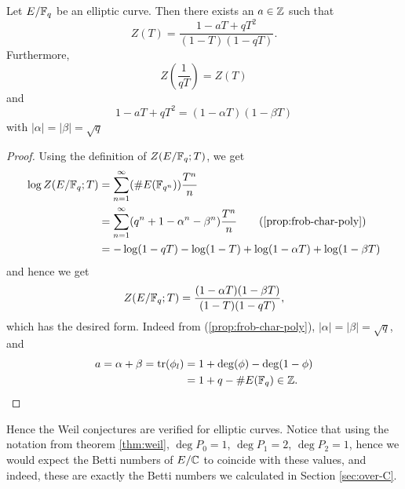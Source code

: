\begin{theorem}
	Let $E/\mathbb{F}_q$ be an elliptic curve. Then there exists an $a \in \mathbb{Z}$ such that
	\begin{equation*}
		Z(T) = \frac{1 - aT + qT^2}{(1-T)(1-qT)}.
	\end{equation*}
	Furthermore,
	\begin{equation*}
		Z\left(\frac{1}{qT}\right) = Z(T)
	\end{equation*}
	and
	\begin{equation*}
		1 - aT + qT^2 = (1 - \alpha T)(1 - \beta T)
	\end{equation*}
	with $|\alpha| = |\beta| = \sqrt{q}$
\end{theorem}

\begin{proof}
	Using the definition of $Z(E/\mathbb{F}_q; T)$, we get
	\begin{align*}
		\log Z(E/\mathbb{F}_q; T) &= \sum_{n=1}^\infty (\#E(\mathbb{F}_{q^n}))\frac{T^n}{n}\\
		&= \sum_{n=1}^\infty (q^n + 1 - \alpha^n - \beta^n)\frac{T^n}{n}
		\qquad \textrm{(\ref{prop:frob-char-poly})}\\
		&= -\log(1 - qT) - \log(1 - T) + \log(1 - \alpha T) + \log(1 - \beta T)
	\end{align*}
	and hence we get
	\begin{equation*}
		Z(E/\mathbb{F}_q; T) = \frac{(1 - \alpha T)(1 - \beta T)}{(1 - T)(1 - qT)},
	\end{equation*}
	which has the desired form.
	Indeed from (\ref{prop:frob-char-poly}), 
	$|\alpha| = |\beta| = \sqrt{q}$, and
	\begin{align*}
		a = \alpha + \beta = \operatorname{tr}(\phi_l) &= 1 + \deg(\phi) - \deg(1 - \phi)\\
		&= 1 + q - \#E(\mathbb{F}_q) \in \mathbb{Z}.
	\end{align*}

\end{proof}

Hence the Weil conjectures are verified for elliptic curves. Notice that
using the notation from theorem \ref{thm:weil},
$\deg P_0 = 1$, $\deg P_1 = 2$, $\deg P_2 = 1$, hence we would expect
the Betti numbers of $E/\mathbb{C}$ to coincide with these values, and indeed, these
are exactly the Betti numbers we calculated in Section \ref{sec:over-C}.

